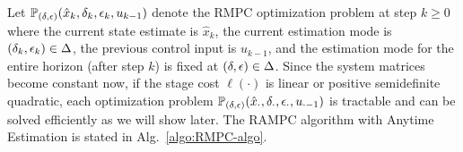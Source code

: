 Let $\mathbb{P}_{(\delta,\epsilon)}(\hat{x}_{k},\delta_{k},\epsilon_{k},u_{k -1})$
denote the RMPC optimization problem at step $k\geq0$ where the current
state estimate is $\hat{x}_{k}$, the current estimation mode is $(\delta_k,\epsilon_k)\in\Delta$,
the previous control input is $u_{k-1}$, and the estimation mode
for the entire horizon (after step $k$) is fixed at $(\delta,\epsilon)\in\Delta$.
Since the system matrices become constant now, if the stage cost $\ell(\cdot)$
is linear or positive semidefinite quadratic, each optimization problem
$\mathbb{P}_{(\delta,\epsilon)}(\hat{x}_{\cdot},\delta_{\cdot},\epsilon_{\cdot},u_{\cdot -1})$ is tractable and can be solved
efficiently as we will show later. 
The RAMPC algorithm with Anytime Estimation is stated in Alg.~\ref{algo:RMPC-algo}.
